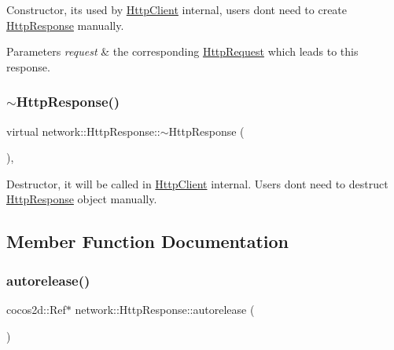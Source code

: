 Constructor, it\textquotesingle{}s used by \hyperlink{classnetwork_1_1HttpClient}{Http\+Client} internal, users don\textquotesingle{}t need to create \hyperlink{classnetwork_1_1HttpResponse}{Http\+Response} manually. 
\begin{DoxyParams}{Parameters}
{\em request} & the corresponding \hyperlink{classnetwork_1_1HttpRequest}{Http\+Request} which leads to this response. \\
\hline
\end{DoxyParams}
\mbox{\label{classnetwork_1_1HttpResponse_aa04ed598ec5a712beb9c2805d7da7d5e}} 
\subsubsection{\texorpdfstring{$\sim$\+Http\+Response()}{~HttpResponse()}\hspace{0.1cm}{\footnotesize\ttfamily [2/2]}}
{\footnotesize\ttfamily virtual network\+::\+Http\+Response\+::$\sim$\+Http\+Response (\begin{DoxyParamCaption}{ }\end{DoxyParamCaption})\hspace{0.3cm}{\ttfamily [inline]}, {\ttfamily [virtual]}}

Destructor, it will be called in \hyperlink{classnetwork_1_1HttpClient}{Http\+Client} internal. Users don\textquotesingle{}t need to destruct \hyperlink{classnetwork_1_1HttpResponse}{Http\+Response} object manually. 

\subsection{Member Function Documentation}
\mbox{\label{classnetwork_1_1HttpResponse_a1b2e5c8062533484d3cbf5ca26b91f8f}} 
\subsubsection{\texorpdfstring{autorelease()}{autorelease()}\hspace{0.1cm}{\footnotesize\ttfamily [1/2]}}
{\footnotesize\ttfamily cocos2d\+::\+Ref$\ast$ network\+::\+Http\+Response\+::autorelease (\begin{DoxyParamCaption}{ }\end{DoxyParamCaption})\hspace{0.3cm}{\ttfamily [inline]}}

